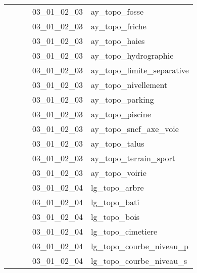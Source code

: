 \documentclass[12pt,titlepage]{book}
\begin{document}
\begin{supertabular}{|p{7.5cm}|p{7.5cm}|p{7.5cm}|c|p{10cm}|}
                   &                    &                    & 03\_01\_02\_03 & ay\_topo\_fosse\\
                   &                    &                    & 03\_01\_02\_03 & ay\_topo\_friche\\
                   &                    &                    & 03\_01\_02\_03 & ay\_topo\_haies\\
                   &                    &                    & 03\_01\_02\_03 & ay\_topo\_hydrographie\\
                   &                    &                    & 03\_01\_02\_03 & ay\_topo\_limite\_separative\\
                   &                    &                    & 03\_01\_02\_03 & ay\_topo\_nivellement\\
                   &                    &                    & 03\_01\_02\_03 & ay\_topo\_parking\\
                   &                    &                    & 03\_01\_02\_03 & ay\_topo\_piscine\\
                   &                    &                    & 03\_01\_02\_03 & ay\_topo\_sncf\_axe\_voie\\
                   &                    &                    & 03\_01\_02\_03 & ay\_topo\_talus\\
                   &                    &                    & 03\_01\_02\_03 & ay\_topo\_terrain\_sport\\
                   &                    &                    & 03\_01\_02\_03 & ay\_topo\_voirie\\
                   &                    &                    & 03\_01\_02\_04 & lg\_topo\_arbre\\
                   &                    &                    & 03\_01\_02\_04 & lg\_topo\_bati\\
                   &                    &                    & 03\_01\_02\_04 & lg\_topo\_bois\\
                   &                    &                    & 03\_01\_02\_04 & lg\_topo\_cimetiere\\
                   &                    &                    & 03\_01\_02\_04 & lg\_topo\_courbe\_niveau\_p\\
                   &                    &                    & 03\_01\_02\_04 & lg\_topo\_courbe\_niveau\_s\\

\end{supertabular}
\end{document}
